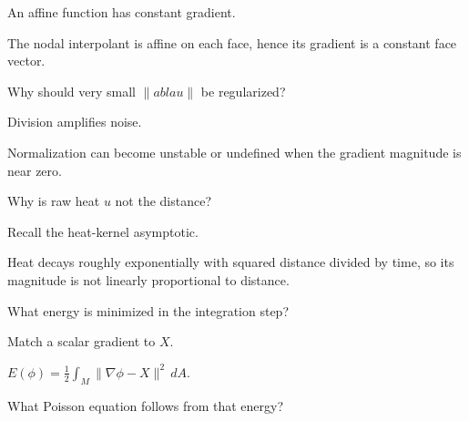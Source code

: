 \begin{hint}
An affine function has constant gradient.
\end{hint}

\begin{solution}
The nodal interpolant is affine on each face, hence its gradient is a constant face vector.
\end{solution}

\begin{exercise}\label{exr:vii40-07}
Why should very small \(\|
abla u\|\) be regularized?
\end{exercise}

\begin{hint}
Division amplifies noise.
\end{hint}

\begin{solution}
Normalization can become unstable or undefined when the gradient magnitude is near zero.
\end{solution}

\begin{exercise}\label{exr:vii40-08}
Why is raw heat \(u\) not the distance?
\end{exercise}

\begin{hint}
Recall the heat-kernel asymptotic.
\end{hint}

\begin{solution}
Heat decays roughly exponentially with squared distance divided by time, so its magnitude is not linearly proportional to distance.
\end{solution}

\begin{exercise}\label{exr:vii40-09}
What energy is minimized in the integration step?
\end{exercise}

\begin{hint}
Match a scalar gradient to \(X\).
\end{hint}

\begin{solution}
\(E(\phi)=\frac12\int_M\|\nabla\phi-X\|^2\,dA\).
\end{solution}

\begin{exercise}\label{exr:vii40-10}
What Poisson equation follows from that energy?
\end{exercise}

